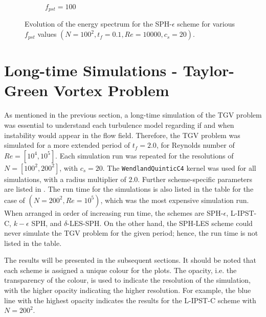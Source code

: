 \begin{figure}[htbp!]
\begin{subfigure}{7cm}
  \caption{$f_{pst} = 100$}
  \end{subfigure}
  \caption{Evolution of the energy spectrum for the SPH-$\epsilon$ scheme for various $f_{pst}$ values $(N=100^2, t_f=0.1, Re=10000, c_s=20)$.}
  \label{fig:sph-eps-pst-espec}
\end{figure}

\section{Long-time Simulations - Taylor-Green Vortex Problem}
As mentioned in the previous section, a long-time simulation of the TGV problem was essential to understand each turbulence model regarding if and when instability would appear in the flow field.
Therefore, the TGV problem was simulated for a more extended period of $t_f = 2.0$, for Reynolds number of $Re=[10^4, 10^5]$. Each simulation run was repeated for the resolutions of $N=[100^2, 200^2]$, with $c_s=20$. The \texttt{WendlandQuinticC4} kernel was used for all simulations, with a radius multiplier of $2.0$. 
Further scheme-specific parameters are listed in .
The run time for the simulations is also listed in the table for the case of $(N=200^2, Re=10^5)$, which was the most expensive simulation run.
When arranged in order of increasing run time, the schemes are SPH-$\epsilon$, L-IPST-C, $k-\epsilon$ SPH, and $\delta$-LES-SPH.
On the other hand, the SPH-LES scheme could never simulate the TGV problem for the given period; hence, the run time is not listed in the table.

The results will be presented in the subsequent sections. It should be noted that each scheme is assigned a unique colour for the plots. The opacity, i.e. the transparency of the colour, is used to indicate the resolution of the simulation, with the higher opacity indicating the higher resolution. For example, the blue line with the highest opacity indicates the results for the L-IPST-C scheme with $N=200^2$.

